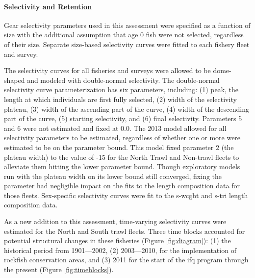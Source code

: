 \documentclass[11pt,
  english,
  letterpaper,
]{article}
\begin{document}
\hypertarget{selectivity-and-retention}{%
\paragraph{Selectivity and Retention}\label{selectivity-and-retention}}

Gear selectivity parameters used in this assessment were specified as a function of size with the additional assumption that age 0 fish were not selected, regardless of their size. Separate size-based selectivity curves were fitted to each fishery fleet and survey.

The selectivity curves for all fisheries and surveys were allowed to be dome-shaped and modeled with double-normal selectivity. The double-normal selectivity curve parameterization has six parameters, including: (1) peak, the length at which individuals are first fully selected, (2) width of the selectivity plateau, (3) width of the ascending part of the curve, (4) width of the descending part of the curve, (5) starting selectivity, and (6) final selectivity. Parameters 5 and 6 were not estimated and fixed at 0.0. The 2013 model allowed for all selectivity parameters to be estimated, regardless of whether one or more were estimated to be on the parameter bound. This model fixed parameter 2 (the plateau width) to the value of -15 for the North Trawl and Non-trawl fleets to alleviate them hitting the lower parameter bound. Though exploratory models run with the plateau width on its lower bound still converged, fixing the parameter had negligible impact on the fits to the length composition data for those fleets. Sex-specific selectivity curves were fit to the \gls{s-wcgbt} and \gls{s-tri} length composition data.

As a new addition to this assessment, time-varying selectivity curves were estimated for the North and South trawl fleets. Three time blocks accounted for potential structural changes in these fisheries (Figure \ref{fig:diagram}): (1) the historical period from 1901---2002, (2) 2003---2010, for the implementation of rockfish conservation areas, and (3) 2011 for the start of the \gls{ifq} program through the present (Figure \ref{fig:timeblocks}).
\end{document}
